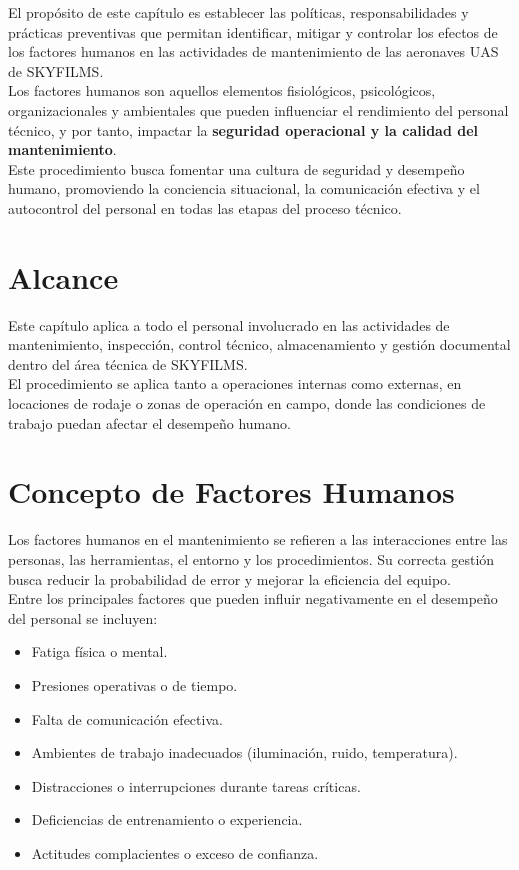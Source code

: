 El propósito de este capítulo es establecer las políticas, responsabilidades y prácticas preventivas que permitan identificar, mitigar y controlar los efectos de los factores humanos en las actividades de mantenimiento de las aeronaves UAS de SKYFILMS.\\

Los factores humanos son aquellos elementos fisiológicos, psicológicos, organizacionales y ambientales que pueden influenciar el rendimiento del personal técnico, y por tanto, impactar la \textbf{seguridad operacional y la calidad del mantenimiento}.\\

Este procedimiento busca fomentar una cultura de seguridad y desempeño humano, promoviendo la conciencia situacional, la comunicación efectiva y el autocontrol del personal en todas las etapas del proceso técnico.

\section{Alcance}

Este capítulo aplica a todo el personal involucrado en las actividades de mantenimiento, inspección, control técnico, almacenamiento y gestión documental dentro del área técnica de SKYFILMS.\\

El procedimiento se aplica tanto a operaciones internas como externas, en locaciones de rodaje o zonas de operación en campo, donde las condiciones de trabajo puedan afectar el desempeño humano.

\section{Concepto de Factores Humanos}
Los factores humanos en el mantenimiento se refieren a las interacciones entre las personas, las herramientas, el entorno y los procedimientos. Su correcta gestión busca reducir la probabilidad de error y mejorar la eficiencia del equipo.\\

Entre los principales factores que pueden influir negativamente en el desempeño del personal se incluyen:

\begin{itemize}
    \item Fatiga física o mental.

    \item Presiones operativas o de tiempo.

    \item Falta de comunicación efectiva.

    \item Ambientes de trabajo inadecuados (iluminación, ruido, temperatura).

    \item Distracciones o interrupciones durante tareas críticas.

    \item Deficiencias de entrenamiento o experiencia.

    \item Actitudes complacientes o exceso de confianza.
\end{itemize}

